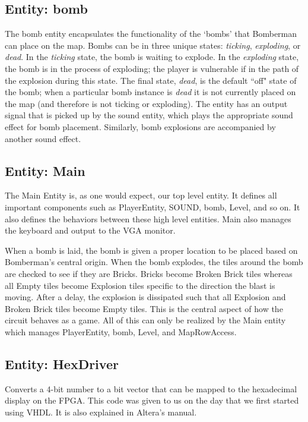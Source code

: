 \documentclass[10pt,a4paper]{article}
\begin{document}
\subsection{Entity: bomb}
The bomb entity encapsulates the functionality of the `bombs' that Bomberman can place on the map. Bombs can be in three unique states: \textit{ticking}, \textit{exploding}, or \textit{dead}. In the \textit{ticking} state, the bomb is waiting to explode. In the \textit{exploding} state, the bomb is in the process of exploding; the player is vulnerable if in the path of the explosion during this state. The final state, \textit{dead}, is the default ``off" state of the bomb; when a particular bomb instance is \textit{dead} it is not currently placed on the map (and therefore is not ticking or exploding). The entity has an output signal that is picked up by the sound entity, which plays the appropriate sound effect for bomb placement. Similarly, bomb explosions are accompanied by another sound effect.

\subsection{Entity: Main}
The Main Entity is, as one would expect, our top level entity. It defines all important components such as PlayerEntity, SOUND, bomb, Level, and so on. It also defines the behaviors between these high level entities. Main also manages the keyboard and output to the VGA monitor.

When a bomb is laid, the bomb is given a proper location to be placed based on Bomberman's central origin. When the bomb explodes, the tiles around the bomb are checked to see if they are Bricks. Bricks become Broken Brick tiles whereas all Empty tiles become Explosion tiles specific to the direction the blast is moving. After a delay, the explosion is dissipated such that all Explosion and Broken Brick tiles become Empty tiles. This is the central aspect of how the circuit behaves as a game. All of this can only be realized by the Main entity which manages PlayerEntity, bomb, Level, and MapRowAccess.

\subsection{Entity: HexDriver}
Converts a 4-bit number to a bit vector that can be mapped to the hexadecimal display on the FPGA. This code was given to us on the day that we first started using VHDL. It is also explained in Altera's manual.
\end{document}
